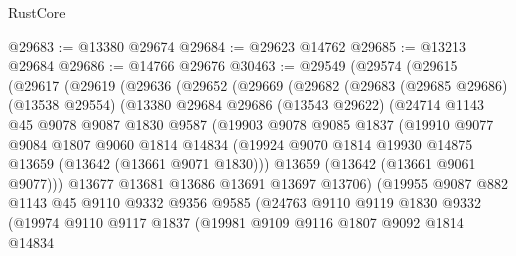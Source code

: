 \begin{lexlean}{RustCore}
\begin{coremodule}
@29683 := @13380 @29674
@29684 := @29623 @14762
@29685 := @13213 @29684
@29686 := @14766 @29676
@30463 := @29549
    (@29574
      (@29615
        (@29617
          (@29619
            (@29636
              (@29652
                (@29669
                  (@29682
                    (@29683
                      (@29685 @29686)
                      (@13538 @29554)
                      (@13380
                        @29684
                        @29686
                        (@13543 @29622)
                        (@24714
                          @1143
                          @45
                          @9078
                          @9087
                          @1830
                          @9587
                          (@19903
                            @9078
                            @9085
                            @1837
                            (@19910
                              @9077
                              @9084
                              @1807
                              @9060
                              @1814
                              @14834
                              (@19924
                                @9070
                                @1814
                                @19930
                                @14875
                                @13659
                                (@13642 (@13661 @9071 @1830)))
                              @13659
                              (@13642 (@13661 @9061 @9077)))
                            @13677
                            @13681
                            @13686
                            @13691
                            @13697
                            @13706)
                          (@19955
                            @9087
                            @882
                            @1143
                            @45
                            @9110
                            @9332
                            @9356
                            @9585
                            (@24763
                              @9110
                              @9119
                              @1830
                              @9332
                              (@19974
                                @9110
                                @9117
                                @1837
                                (@19981
                                  @9109
                                  @9116
                                  @1807
                                  @9092
                                  @1814
                                  @14834

\end{coremodule}
\end{lexlean}
